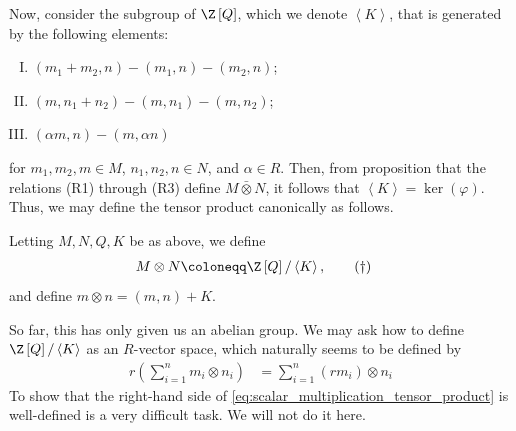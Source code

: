\documentclass[10pt]{mypackage}
\renewcommand{\coloneq}{\coloneqq}
\begin{document}
Now, consider the subgroup of $\Z\left[ Q \right]$, which we denote $ \left\langle K \right\rangle $, that is generated by the following elements:
\begin{enumerate}[(I)]
  \item $\left( m_1 + m_2,n \right) - \left( m_1,n \right) - \left( m_2,n \right)$;
  \item $\left( m,n_1 + n_2 \right) - \left( m,n_1 \right) - \left( m,n_2 \right)$;
  \item $\left( \alpha m,n \right) - \left( m,\alpha n \right)$
\end{enumerate}
for $m_1,m_2,m\in M$, $n_1,n_2,n\in N$, and $\alpha\in R$. Then, from proposition that the relations (R1) through (R3) define $M\bar\otimes N$, it follows that $\left\langle K \right\rangle = \ker\left( \varphi \right)$. Thus, we may define the tensor product canonically as follows.
\begin{definition}
  Letting $M,N,Q,K$ be as above, we define
  \begin{align*}
    M\otimes N &\coloneq \Z\left[ Q \right]/\left\langle K \right\rangle, \label{def:tensor_product_modules}\tag{$\dag$}
  \end{align*}
  and define $m\otimes n = \left( m,n \right) + K$.
\end{definition}
So far, this has only given us an abelian group. We may ask how to define $\Z\left[ Q \right]/\left\langle K \right\rangle$ as an $R$-vector space, which naturally seems to be defined by
\begin{align*}
  r\left( \sum_{i=1}^{n}m_i\otimes n_i \right) &= \sum_{i=1}^{n}\left( rm_i \right)\otimes n_i \label{eq:scalar_multiplication_tensor_product}\tag{$\ast$}
\end{align*}
To show that the right-hand side of \eqref{eq:scalar_multiplication_tensor_product} is well-defined is a very difficult task. We will not do it here.
\end{document}
